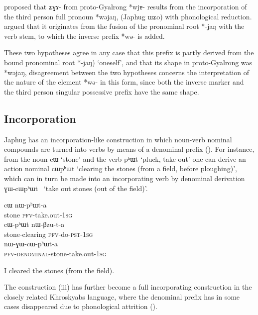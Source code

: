 \documentclass[oldfontcommands,oneside,a4paper,11pt]{article}
\newcommand{\ipa}[1]{\mbox{\phon #1}} %
\begin{document}
\citet{jacques10refl} proposed that \ipa{ʑɣɤ-} from proto-Gyalrong *\ipa{wjɐ-} results from the incorporation of the third person full pronoun *\ipa{wəjaŋ}, (Japhug \ipa{ɯʑo}) with phonological reduction. \citet{jackson14morpho} argued that it originates from the fusion of the pronominal root *\ipa{-jaŋ} with the verb stem, to which the inverse prefix *\ipa{wə-} is added.

These two hypotheses agree in any case that this prefix is partly derived from the bound pronominal root *\ipa{-jaŋ}) `oneself', and that its shape in proto-Gyalrong was *\ipa{wəjaŋ}, disagreement between the two hypotheses concerns the interpretation of the nature of the element *\ipa{wə-} in this form, since both the inverse marker and the third person singular possessive prefix have the same shape.

\subsection{Incorporation}
Japhug has an incorporation-like construction in which noun-verb nominal compounds are turned into verbs by means of a denominal prefix (\citealt{jacques12incorp}). For instance, from the noun \ipa{cɯ} `stone' and the verb \ipa{pʰɯt} `pluck, take out' one can derive an action nominal   \ipa{cɯpʰɯt} `clearing the stones (from a field, before ploughing)', which can in turn be made into an incorporating verb by denominal derivation  \ipa{ɣɯ-cɯpʰɯt } `take out stones (out of the field)'. 

\begin{exe}   
\ex
\begin{xlist}[(ii)]
\gll     \ipa{cɯ} \ipa{nɯ-pʰɯt-a}  \\
  stone \textsc{pfv}-take.out-\textsc{1sg} \\
\gll     \ipa{cɯ-pʰɯt} \ipa{nɯ-βzu-t-a}  \\
  stone-clearing \textsc{pfv}-do-\textsc{pst}-\textsc{1sg} \\
\gll     \ipa{nɯ-ɣɯ-cɯ-pʰɯt-a}  \\
  \textsc{pfv-denominal}-stone-take.out-\textsc{1sg} \\
  \end{xlist}
  \glt   I cleared the stones (from the field). 
\end{exe}   

The construction (iii) has further become a full incorporating construction in the closely related Khroskyabs language, where the denominal prefix has in some cases disappeared due to phonological attrition (\citealt{lai13affixale}).
\end{document}

